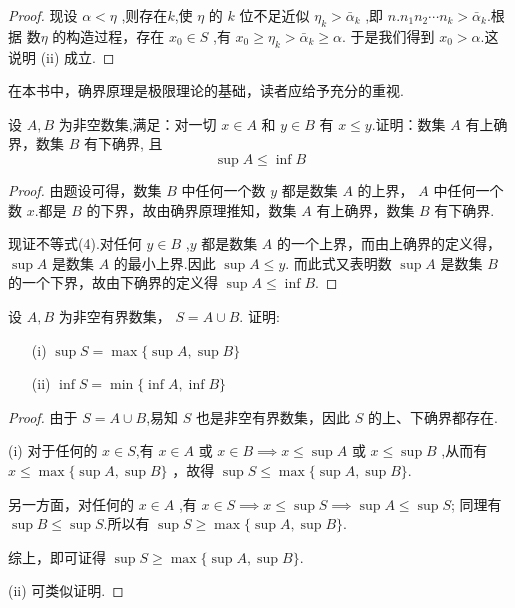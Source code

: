 \begin{proof}
    现设 $\alpha<\eta$ ,则存在$k$,使 $\eta$ 的 $k$ 位不足近似 $\eta_k>\bar \alpha_k$ ,即 $n.n_1n_2\cdots n_k>\bar \alpha_k$.根据 数$\eta$ 的构造过程，存在 $x_0\in S$ ,有 $x_0 \ge \eta_k > \bar \alpha_k \ge \alpha$. 于是我们得到 $x_0>\alpha$.这说明 (ii) 成立.
\end{proof}

在本书中，确界原理是极限理论的基础，读者应给予充分的重视.

\begin{example}
    设 $A,B$ 为非空数集,满足：对一切 $x\in A$ 和 $y\in B$ 有 $x\le y$.证明：数集 $A$ 有上确界，数集 $B$ 有下确界, 且 \begin{equation}
        \sup A\le \inf B 
    \end{equation} 
\end{example}

\begin{proof}
    由题设可得，数集 $B$ 中任何一个数 $y$ 都是数集 $A$ 的上界， $A$ 中任何一个数 $x$.都是 $B$ 的下界，故由确界原理推知，数集 $A$ 有上确界，数集 $B$ 有下确界.

    现证不等式(4).对任何 $y\in B$ ,$y$ 都是数集 $A$ 的一个上界，而由上确界的定义得，$\sup A$ 是数集 $A$ 的最小上界.因此 $\sup A\le y$. 而此式又表明数 $\sup A$ 是数集 $B$ 的一个下界，故由下确界的定义得 $\sup A\le \inf B$.
\end{proof}

\begin{example}
    设 $A,B$ 为非空有界数集， $S=A\cup B$. 证明:
    \begin{enumerate}
        \item[(i)] $\sup S=\max \{\sup A,\sup B\}$
        \item[(ii)] $\inf S=\min \{\inf A,\inf B\}$
    \end{enumerate}
\end{example}

\begin{proof}
    由于 $S=A\cup B$,易知 $S$ 也是非空有界数集，因此 $S$ 的上、下确界都存在.

    (i) 对于任何的 $x\in S$,有 $x\in A$ 或 $x\in B \implies x\le \sup A$ 或 $x \le \sup B$ ,从而有 $x\le \max \{\sup A,\sup B\}$ ，故得 $\sup S \le \max \{\sup A,\sup B\}$.

    另一方面，对任何的 $x\in A$ ,有 $x\in S \implies x \le \sup S \implies \sup A\le \sup S$; 同理有 $\sup B \le \sup S$.所以有 $\sup S\ge \max \{\sup A,\sup B\}$.

    综上，即可证得 $\sup S\ge \max \{\sup A,\sup B\}$.

    (ii) 可类似证明.
\end{proof}

